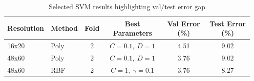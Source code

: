 \documentclass[12pt, letterpaper]{article}
\begin{document}
\begin{table}[htbp]
	\centering
	\caption{Selected SVM results highlighting val/test error gap}
	\begin{tabular}{llcccc}
		\toprule
		\textbf{Resolution} & \textbf{Method} & \textbf{Fold} & \textbf{Best Parameters} & \textbf{Val Error (\%)} & \textbf{Test Error (\%)} \\
		\midrule
		16x20               & Poly            & 2             & $C=0.1,\ D=1$            & 4.51                    & 9.02                     \\
		48x60               & Poly            & 2             & $C=0.1,\ D=1$            & 3.76                    & 9.02                     \\
		48x60               & RBF             & 2             & $C=1,\ \gamma=0.1$       & 3.76                    & 8.27                     \\
		\bottomrule
	\end{tabular}
	\label{tab:val_test_gap}
\end{table}
\end{document}
